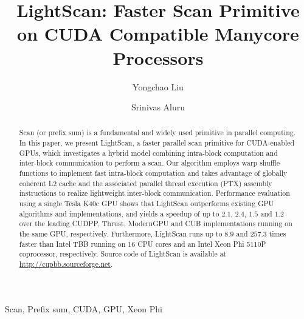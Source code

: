 \documentclass[article]{elsarticle}
\renewcommand{\hl}[1]{#1}
\begin{document}
\begin{frontmatter}
\title{LightScan: Faster Scan Primitive on CUDA Compatible Manycore Processors}

\author{Yongchao Liu}
\author{Srinivas Aluru}

\address{School of Computational Science \& Engineering\\
 Georgia Institute of Technology\\Atlanta, USA}


\begin{abstract}
Scan (or prefix sum) is a fundamental and widely used primitive in parallel computing. In this paper, we present LightScan, a faster parallel scan primitive for CUDA-enabled GPUs, which investigates a hybrid model combining intra-block computation and inter-block communication to perform a scan. Our algorithm employs warp shuffle functions to implement fast intra-block computation and takes advantage of globally coherent L2 cache and the associated parallel thread execution (PTX) assembly instructions to realize lightweight inter-block communication. Performance evaluation using a single Tesla K40c GPU shows that LightScan outperforms existing GPU algorithms and implementations, and yields a speedup of up to $2.1$, $2.4$, $1.5$ and $1.2$ over the leading CUDPP, Thrust, ModernGPU and CUB implementations running on the same GPU, respectively. Furthermore, LightScan runs up to $8.9$ and $257.3$ times faster than Intel TBB running on 16 CPU cores and an Intel Xeon Phi 5110P coprocessor, respectively. \hl{Source code of LightScan is available at \url{http://cupbb.sourceforge.net}.}
\end{abstract}

\begin{keyword}
Scan, Prefix sum, CUDA, GPU, Xeon Phi
\end{keyword}
\end{frontmatter}
\end{document}
